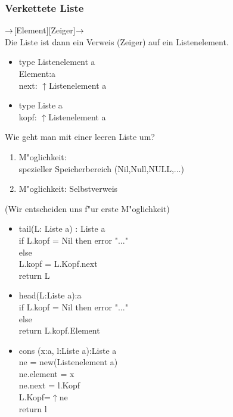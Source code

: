 \documentclass[a4paper,twoside,DIV15,BCOR12mm]{scrbook}
\begin{document}
\subsubsection*{Verkettete Liste}
$\rightarrow$[Element][Zeiger]$\rightarrow$\\
Die Liste ist dann ein Verweis (Zeiger) auf ein Listenelement.
\begin{itemize}

\item 
	type Listenelement a\\
	Element:a\\
	next: $\uparrow$Listenelement a\\
\item
	type Liste a\\
	kopf: $\uparrow$Listenelement a\\
\end{itemize}
	Wie geht man mit einer leeren Liste um?
	\begin{enumerate}
		\item M"oglichkeit: \\
			spezieller Speicherbereich (Nil,Null,NULL,...) 
		\item M"oglichkeit:  Selbstverweis 	
	\end{enumerate}
	(Wir entscheiden uns f"ur erste M"oglichkeit)
\begin{itemize}
\item
	tail(L: Liste a) : Liste a\\
		if L.kopf = Nil	then error "..."\\
		else \\
			L.kopf = L.Kopf.next\\
	return L\\
\item	
	head(L:Liste a):a\\
		if L.kopf = Nil then error "..."\\
		else \\
		return L.kopf.Element\\
		
\item
	cons (x:a, l:Liste a):Liste a\\
	ne = new(Listenelement a)\\
	ne.element = x\\
	ne.next = l.Kopf\\
	L.Kopf=$\uparrow$ne\\
	return l\\
	
\end{itemize}
\end{document}
